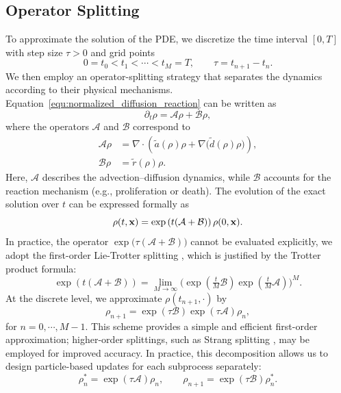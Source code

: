 \documentclass[preprint,12pt]{elsarticle}
\theoremstyle{definition}
\theoremstyle{remark}
\begin{document}
\subsection{Operator Splitting}
To approximate the solution of the PDE, we discretize the time interval $[0,T]$ with step size $\tau>0$ and grid points
\[
0 = t_0 < t_1 < \cdots < t_M = T,\qquad \tau=t_{n+1}-t_n.
\]
We then employ an operator-splitting strategy that separates the dynamics according to their physical mechanisms. 
Equation~\eqref{equ:normalized_diffusion_reaction} can be written as
\begin{equation}
\partial_t \rho = \mathcal{A}\rho + \mathcal{B}\rho ,
\end{equation}
where the operators $\mathcal{A}$ and $\mathcal{B}$ correspond to
\begin{align}
\mathcal{A}\rho &= \nabla \cdot \left( \tilde a(\rho)\rho + \nabla \!\big(\tilde d(\rho)\rho \big) \right), \\[4pt]
\mathcal{B}\rho &= \tilde r(\rho)\rho .
\end{align}
Here, $\mathcal{A}$ describes the advection--diffusion dynamics, while $\mathcal{B}$ accounts for the reaction mechanism (e.g., proliferation or death).  The evolution of the exact solution over $t$ can be expressed formally as
\begin{equation}
\rho(t,\mathbf{x}) = \exp\left( t (\mathcal{A} + \mathcal{B}) \right)\rho(0,\mathbf{x}).
\end{equation}
In practice, the operator $\exp\!\big(\tau(\mathcal{A}+\mathcal{B})\big)$ cannot be evaluated explicitly, 
we adopt the first-order Lie-Trotter splitting \cite{trotter1959product}, which is justified by the Trotter product formula:
\begin{equation}
\exp\!\left( t (\mathcal{A} + \mathcal{B}) \right) 
= \lim_{M\to\infty} \Big( \exp\!\left(\tfrac{t}{M} \mathcal{B}\right) 
                          \exp\!\left(\tfrac{t}{M} \mathcal{A}\right) \Big)^M .
\end{equation}
At the discrete level, we approximate $\rho(t_{n+1},\cdot)$ by
\begin{equation}
\rho_{n+1} = \exp(\tau \mathcal{B}) \exp(\tau \mathcal{A}) \rho_n ,
\end{equation}
for $n=0,\cdots,M-1$.
This scheme provides a simple and efficient first-order approximation; 
higher-order splittings, such as Strang splitting \cite{strang1968construction}, may be employed for improved accuracy.
In practice, this decomposition allows us to design particle-based updates for each subprocess separately:
\begin{equation}
\rho_n^\ast = \exp(\tau \mathcal{A})\rho_n, 
\qquad 
\rho_{n+1} = \exp(\tau \mathcal{B})\rho_n^\ast.
\end{equation}
\end{document}
